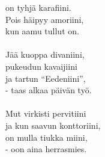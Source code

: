             on tyhjä karafiini. \\
            Pois häipyy amoriini, \\
            kun aamu tullut on. \\
\hspace{10mm} \\
            Jää kuoppa divaniini, \\
            pukeudun kavaijiini \\
            ja tartun “Eedeniini”, \\
            - taas alkaa päivän työ. \\
\hspace{10mm} \\
            Mut virkisti pervitiini \\
            ja kun saavun konttoriini, \\
            on mulla tiukka miini, \\
            - oon aina herrasmies. \\
